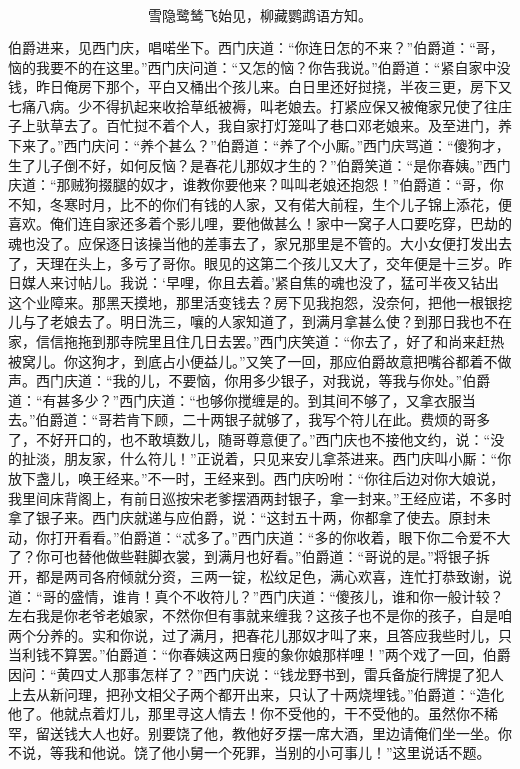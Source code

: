 \[
雪隐鹭鸶飞始见，柳藏鹦鹉语方知。
\]

伯爵进来，见西门庆，唱喏坐下。西门庆道：“你连日怎的不来？”伯爵道：“哥，恼的我要不的在这里。”西门庆问道：“又怎的恼？你告我说。”伯爵道：“紧自家中没钱，昨日俺房下那个，平白又桶出个孩儿来。白日里还好挝挠，半夜三更，房下又七痛八病。少不得扒起来收拾草纸被褥，叫老娘去。打紧应保又被俺家兄使了往庄子上驮草去了。百忙挝不着个人，我自家打灯笼叫了巷口邓老娘来。及至进门，养下来了。”西门庆问：“养个甚么？”伯爵道：“养了个小厮。”西门庆骂道：“傻狗才，生了儿子倒不好，如何反恼？是春花儿那奴才生的？”伯爵笑道：“是你春姨。”西门庆道：“那贼狗掇腿的奴才，谁教你要他来？叫叫老娘还抱怨！”伯爵道：“哥，你不知，冬寒时月，比不的你们有钱的人家，又有偌大前程，生个儿子锦上添花，便喜欢。俺们连自家还多着个影儿哩，要他做甚么！家中一窝子人口要吃穿，巴劫的魂也没了。应保逐日该操当他的差事去了，家兄那里是不管的。大小女便打发出去了，天理在头上，多亏了哥你。眼见的这第二个孩儿又大了，交年便是十三岁。昨日媒人来讨帖儿。我说：‘早哩，你且去着。’紧自焦的魂也没了，猛可半夜又钻出这个业障来。那黑天摸地，那里活变钱去？房下见我抱怨，没奈何，把他一根银挖儿与了老娘去了。明日洗三，嚷的人家知道了，到满月拿甚么使？到那日我也不在家，信信拖拖到那寺院里且住几日去罢。”西门庆笑道：“你去了，好了和尚来赶热被窝儿。你这狗才，到底占小便益儿。”又笑了一回，那应伯爵故意把嘴谷都着不做声。西门庆道：“我的儿，不要恼，你用多少银子，对我说，等我与你处。”伯爵道：“有甚多少？”西门庆道：“也够你搅缠是的。到其间不够了，又拿衣服当去。”伯爵道：“哥若肯下顾，二十两银子就够了，我写个符儿在此。费烦的哥多了，不好开口的，也不敢填数儿，随哥尊意便了。”西门庆也不接他文约，说：“没的扯淡，朋友家，什么符儿！”正说着，只见来安儿拿茶进来。西门庆叫小厮：“你放下盏儿，唤王经来。”不一时，王经来到。西门庆吩咐：“你往后边对你大娘说，我里间床背阁上，有前日巡按宋老爹摆酒两封银子，拿一封来。”王经应诺，不多时拿了银子来。西门庆就递与应伯爵，说：“这封五十两，你都拿了使去。原封未动，你打开看看。”伯爵道：“忒多了。”西门庆道：“多的你收着，眼下你二令爱不大了？你可也替他做些鞋脚衣裳，到满月也好看。”伯爵道：“哥说的是。”将银子拆开，都是两司各府倾就分资，三两一锭，松纹足色，满心欢喜，连忙打恭致谢，说道：“哥的盛情，谁肯！真个不收符儿？”西门庆道：“傻孩儿，谁和你一般计较？左右我是你老爷老娘家，不然你但有事就来缠我？这孩子也不是你的孩子，自是咱两个分养的。实和你说，过了满月，把春花儿那奴才叫了来，且答应我些时儿，只当利钱不算罢。”伯爵道：“你春姨这两日瘦的象你娘那样哩！”两个戏了一回，伯爵因问：“黄四丈人那事怎样了？”西门庆说：“钱龙野书到，雷兵备旋行牌提了犯人上去从新问理，把孙文相父子两个都开出来，只认了十两烧埋钱。”伯爵道：“造化他了。他就点着灯儿，那里寻这人情去！你不受他的，干不受他的。虽然你不稀罕，留送钱大人也好。别要饶了他，教他好歹摆一席大酒，里边请俺们坐一坐。你不说，等我和他说。饶了他小舅一个死罪，当别的小可事儿！”这里说话不题。

